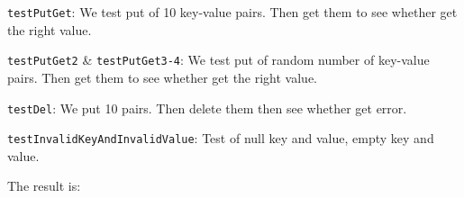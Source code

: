 \documentclass{article}
\begin{document}
\begin{compactitem}
\item \texttt{testPutGet}: We test put of 10 key-value pairs. Then get them to see whether get the right value.
\item \texttt{testPutGet2} \& \texttt{testPutGet3-4}: We test put of random number of key-value pairs. Then get them to see whether get the right value.
\item \texttt{testDel}: We put 10 pairs. Then delete them then see whether get error.
\item \texttt{testInvalidKeyAndInvalidValue}: Test of null key and value, empty key and value.
\end{compactitem}

The result is:
\begin{lstlisting}

\end{lstlisting}
\end{document}
